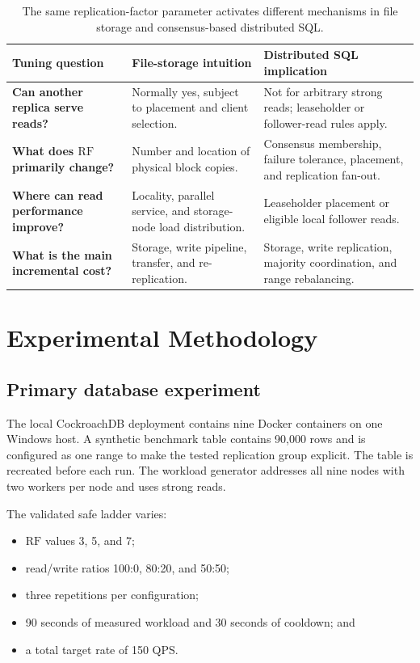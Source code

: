 \documentclass[a4paper,10pt,twocolumn]{article}
\newcommand{\rf}{\ensuremath{\mathrm{RF}}}
\newcommand{\cockroach}{CockroachDB}
\newcommand{\qps}{QPS}
\begin{document}
\begin{table}[t]
\centering
\caption{The same replication-factor parameter activates different mechanisms
in file storage and consensus-based distributed SQL.}
\label{tab:architecture}
\small
\begin{tabularx}{\textwidth}{@{}>{\raggedright\arraybackslash\bfseries}p{}
                              X
                              X@{}}
\toprule
Tuning question & File-storage intuition & Distributed SQL implication \\
\midrule
Can another replica serve reads?
  & Normally yes, subject to placement and client selection.
  & Not for arbitrary strong reads; leaseholder or follower-read rules apply. \\
What does \rf{} primarily change?
  & Number and location of physical block copies.
  & Consensus membership, failure tolerance, placement, and replication fan-out. \\
Where can read performance improve?
  & Locality, parallel service, and storage-node load distribution.
  & Leaseholder placement or eligible local follower reads. \\
What is the main incremental cost?
  & Storage, write pipeline, transfer, and re-replication.
  & Storage, write replication, majority coordination, and range rebalancing. \\
\bottomrule
\end{tabularx}
\end{table}

\section{Experimental Methodology}
\label{sec:method}

\subsection{Primary database experiment}

The local \cockroach{} deployment contains nine Docker containers on one
Windows host. A synthetic benchmark table contains 90,000 rows and is
configured as one range to make the tested replication group explicit. The
table is recreated before each run. The workload generator addresses all nine
nodes with two workers per node and uses strong reads.

The validated safe ladder varies:

\begin{itemize}
  \item \rf{} values 3, 5, and 7;
  \item read/write ratios 100:0, 80:20, and 50:50;
  \item three repetitions per configuration;
  \item 90 seconds of measured workload and 30 seconds of cooldown; and
  \item a total target rate of 150 \qps{}.
\end{itemize}
\end{document}
